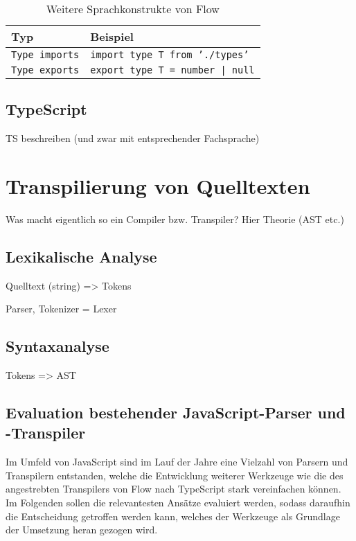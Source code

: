 \begin{table}
  \begin{tabularx}{\textwidth}{@{}ll@{}}
    \midrule
    \textbf{Typ}               & \textbf{Beispiel}                      \\
    \midrule
    \texttt{Type imports}     & \texttt{import type T from './types'}   \\
    \texttt{Type exports}     & \texttt{export type T = number | null}  \\
    \midrule
  \end{tabularx}
  \caption{Weitere Sprachkonstrukte von Flow}
  \label{tab:flow-other-constructs}
\end{table}


\subsection{TypeScript}
  TS beschreiben (und zwar mit entsprechender Fachsprache)

\section{Transpilierung von Quelltexten}

  Was macht eigentlich so ein Compiler bzw. Transpiler? Hier Theorie (AST etc.)

\subsection{Lexikalische Analyse}

  Quelltext (string) => Tokens

  Parser, Tokenizer = Lexer

\subsection{Syntaxanalyse}

  Tokens => AST

\subsection{Evaluation bestehender JavaScript-Parser und -Transpiler}
\label{subsec:js-transpilers}

Im Umfeld von JavaScript sind im Lauf der Jahre eine Vielzahl von Parsern und Transpilern entstanden, welche die Entwicklung weiterer Werkzeuge wie die des angestrebten Transpilers von Flow nach TypeScript stark vereinfachen können. Im Folgenden sollen die relevantesten Ansätze evaluiert werden, sodass daraufhin die Entscheidung getroffen werden kann, welches der Werkzeuge als Grundlage der Umsetzung heran gezogen wird.

